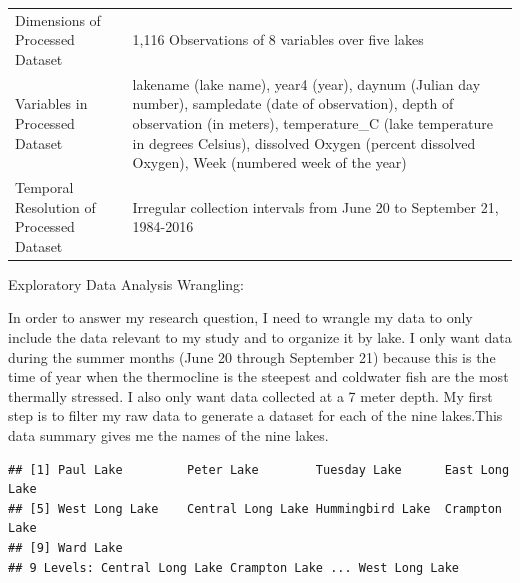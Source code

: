 \documentclass[12pt,]{article}
\newenvironment{Shaded}{\begin{snugshade}}{\end{snugshade}}
\newcommand{\KeywordTok}[1]{\textcolor[rgb]{0.13,0.29,0.53}{\textbf{#1}}}
\newcommand{\OperatorTok}[1]{\textcolor[rgb]{0.81,0.36,0.00}{\textbf{#1}}}
\newcommand{\NormalTok}[1]{#1}
\begin{document}
\begin{longtable}[]{@{}ll@{}}
\begin{minipage}[t]{0.33\columnwidth}\raggedright\strut
Dimensions of Processed Dataset\strut
\end{minipage} & \begin{minipage}[t]{0.61\columnwidth}\raggedright\strut
1,116 Observations of 8 variables over five lakes\strut
\end{minipage}\tabularnewline
\begin{minipage}[t]{0.33\columnwidth}\raggedright\strut
Variables in Processed Dataset\strut
\end{minipage} & \begin{minipage}[t]{0.61\columnwidth}\raggedright\strut
lakename (lake name), year4 (year), daynum (Julian day number),
sampledate (date of observation), depth of observation (in meters),
temperature\_C (lake temperature in degrees Celsius), dissolved Oxygen
(percent dissolved Oxygen), Week (numbered week of the year)\strut
\end{minipage}\tabularnewline
\begin{minipage}[t]{0.33\columnwidth}\raggedright\strut
Temporal Resolution of Processed Dataset\strut
\end{minipage} & \begin{minipage}[t]{0.61\columnwidth}\raggedright\strut
Irregular collection intervals from June 20 to September 21,
1984-2016\strut
\end{minipage}\tabularnewline
\bottomrule
\end{longtable}

Exploratory Data Analysis Wrangling:

In order to answer my research question, I need to wrangle my data to
only include the data relevant to my study and to organize it by lake. I
only want data during the summer months (June 20 through September 21)
because this is the time of year when the thermocline is the steepest
and coldwater fish are the most thermally stressed. I also only want
data collected at a 7 meter depth. My first step is to filter my raw
data to generate a dataset for each of the nine lakes.This data summary
gives me the names of the nine lakes.

\begin{Shaded}
\end{Shaded}

\begin{verbatim}
## [1] Paul Lake         Peter Lake        Tuesday Lake      East Long Lake   
## [5] West Long Lake    Central Long Lake Hummingbird Lake  Crampton Lake    
## [9] Ward Lake        
## 9 Levels: Central Long Lake Crampton Lake ... West Long Lake
\end{verbatim}
\end{document}
